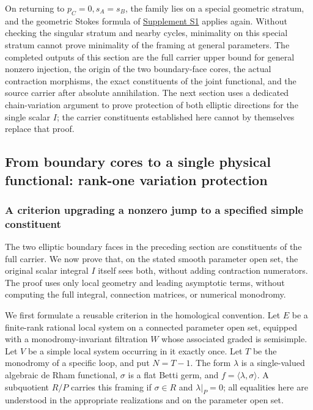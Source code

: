 \documentclass[11pt,a4paper,oneside]{article}
\theoremstyle{plain}
\theoremstyle{definition}
\theoremstyle{remark}
\numberwithin{equation}{section}
\newcommand{\otherref}[2]{\href{#1.pdf}{#2}}
\begin{document}
On returning to $p_C=0,s_A=s_B$, the family lies on a special geometric stratum, and the geometric Stokes formula of \otherref{feynman_periods_supplement_en}{Supplement S1} applies again.
Without checking the singular stratum and nearby cycles, minimality on this special stratum cannot prove minimality of the framing at general parameters.
The completed outputs of this section are the full carrier upper bound for general nonzero injection, the origin of the two boundary-face cores,
the actual contraction morphisms, the exact constituents of the joint functional, and the source carrier after absolute annihilation.
The next section uses a dedicated chain-variation argument to prove protection of both elliptic directions for the single scalar $I$;
the carrier constituents established here cannot by themselves replace that proof.



\subsection{From boundary cores to a single physical functional: rank-one variation protection}
\label{unified:sec:scalarboundary}
\subsubsection{A criterion upgrading a nonzero jump to a specified simple constituent}
The two elliptic boundary faces in the preceding section are constituents of the full carrier.
We now prove that, on the stated smooth parameter open set, the original scalar integral $I$ itself sees both,
without adding contraction numerators. The proof uses only local geometry and leading asymptotic terms,
without computing the full integral, connection matrices, or numerical monodromy.

We first formulate a reusable criterion in the homological convention.
Let $E$ be a finite-rank rational local system on a connected parameter open set,
equipped with a monodromy-invariant filtration $W$ whose associated graded is semisimple.
Let $V$ be a simple local system occurring in it exactly once.
Let $T$ be the monodromy of a specific loop, and put $N=T-1$.
The form $\lambda$ is a single-valued algebraic de Rham functional, $\sigma$ is a flat Betti germ,
and $f=\langle\lambda,\sigma\rangle$.
A subquotient $R/P$ carries this framing if $\sigma\in R$ and $\lambda|_P=0$;
all equalities here are understood in the appropriate realizations and on the parameter open set.
\end{document}
